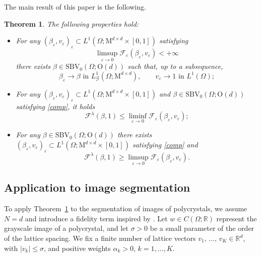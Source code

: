 \documentclass[a4paper,reqno]{amsart}
\newcommand\R{\mathbb{R}}
\newcommand\Rn{\mathbb{R}^d}
\newcommand\LG{{L}^1_\G}
\newtheorem{theorem}[definition]{Theorem}
\theoremstyle{remark}
\newcommand{\F}{\mathcal{F}}
\newcommand{\G}{\mathcal{G}}
\newcommand{\On}{\mathrm{O}(d)}
\newcommand{\Mno}{\mathrm{M}^{d\times d}}
\newcommand{\PC}{\mathrm{SBV}_0}
\numberwithin{equation}{section}
\begin{document}
The main result of this paper is the following.
\begin{theorem}\label{thm:main}
	The following properties hold:
	\begin{itemize}
		\item[(C)] 
		For any $(\beta_\varepsilon, v_\varepsilon)_\varepsilon \subset L^1(\Omega;\Mno \times[0,1])$ satisfying 
		\begin{equation}\label{compest}
			\limsup_{\varepsilon\to 0} \F_\varepsilon(\beta_\varepsilon, v_\varepsilon)<+\infty
		\end{equation}
		there exists $\beta \in \PC(\Omega; \On)$ such that, up to a subsequence,
		\begin{equation}\label{comp}
			\beta_\varepsilon \to \beta \text{ in }\LG(\Omega; \Mno),\qquad v_\varepsilon \to 1 \text{ in }L^1(\Omega);
		\end{equation}
		\item[(LB)] 
		For any $(\beta_\varepsilon, v_\varepsilon)_\varepsilon \subset L^1(\Omega;\Mno \times[0,1])$ and $\beta \in \PC(\Omega; \On)$ satisfying \eqref{comp}, it holds
		\begin{equation*}\label{liminf}
			\F^\lambda(\beta,1)\leq \liminf_{\varepsilon \to 0} \F_\varepsilon(\beta_\varepsilon, v_\varepsilon);
		\end{equation*}
		\item[(UB)] 
		For any $\beta \in \PC(\Omega; \On)$ there exists $(\beta_\varepsilon, v_\varepsilon)_\varepsilon \subset L^1(\Omega;\Mno \times[0,1])$ satisfying \eqref{comp} and
		\begin{equation}\label{limsupthm}
			\F^\lambda(\beta,1)\geq \limsup_{\varepsilon \to 0} \F_\varepsilon(\beta_\varepsilon, v_\varepsilon).
		\end{equation}
	\end{itemize}
\end{theorem}


\subsection{Application to image segmentation}
 To apply Theorem~\ref{thm:main} to the
 segmentation of images of polycrystals,
 we assume $N=d$ and
 introduce a fidelity term inspired by \cite{BerkelsRaetzRumpfVoigt2008,ElsWir}.
Let $w\in C(\Omega; \R)$
represent the grayscale image of a polycrystal, and let $\sigma>0$ be a small parameter of the order of the lattice spacing.
We fix a finite number of  lattice vectors
$v_1,\,\dots,\, v_K \in \Rn$, with $|v_k|\leq \sigma$,
and positive weights $\alpha_k>0$, $k=1,\ldots,K$.
\end{document}
